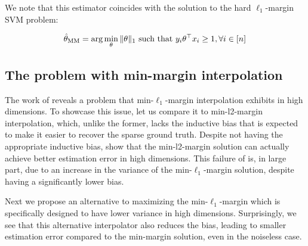 We note that this estimator coincides with the solution to the hard
$\ell_1$-margin SVM problem:

\begin{align}
  \hat{\theta}_{\mathrm{MM}} = \arg\min_{\theta} \|\theta\|_1 \text{ such that } y_i\theta^\top x_i \ge 1, \forall i \in
  [n]
\end{align}

\subsection{The problem with min-margin interpolation}

The work of \citet{konstantin} reveals a problem that min-$\ell_1$-margin
interpolation exhibits in high dimensions.  To showcase this issue, let us
compare it to min-l2-margin interpolation, which, unlike the former, lacks the
inductive bias that is expected to make it easier to recover the sparse ground
truth. Despite not having the appropriate inductive bias, \citet{konstantin}
show that the min-l2-margin solution can actually achieve better estimation
error in high dimensions. 
This failure of is, in large part, due to an increase in the variance of the
min-$\ell_1$-margin solution, despite having a significantly lower bias.

Next we propose an alternative to maximizing the min-$\ell_1$-margin which is
specifically designed to have lower variance in high dimensions.  Surprisingly,
we see that this alternative interpolator also reduces the bias, leading to
smaller estimation error compared to the min-margin solution, even in the
noiseless case.


